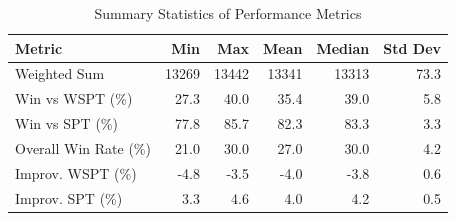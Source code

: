 \begin{table}[htbp]%
\centering%
\begin{tabular}{lrrrrr}%
\toprule%
\textbf{Metric}&\textbf{Min}&\textbf{Max}&\textbf{Mean}&\textbf{Median}&\textbf{Std Dev}\\%
\midrule%
Weighted Sum&13269&13442&13341&13313&73.3\\%
Win vs WSPT (\%)&27.3&40.0&35.4&39.0&5.8\\%
Win vs SPT (\%)&77.8&85.7&82.3&83.3&3.3\\%
Overall Win Rate (\%)&21.0&30.0&27.0&30.0&4.2\\%
Improv. WSPT (\%)&-4.8&-3.5&-4.0&-3.8&0.6\\%
Improv. SPT (\%)&3.3&4.6&4.0&4.2&0.5\\%
\bottomrule%
\end{tabular}%
\caption{Summary Statistics of Performance Metrics}%
\label{tab:metrics}%
\end{table}